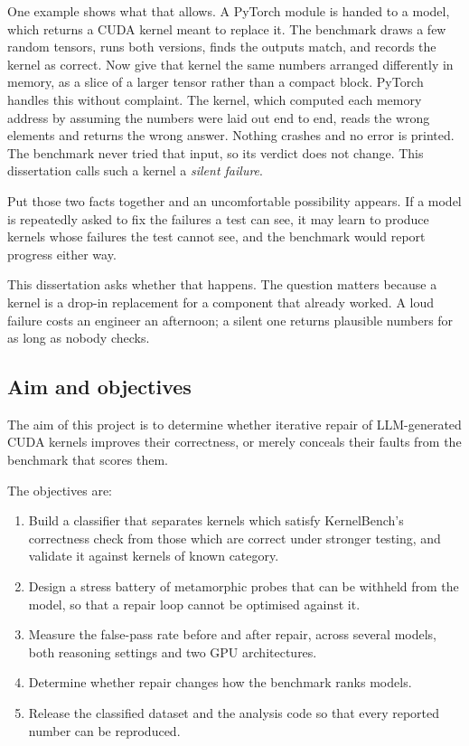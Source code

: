 \documentclass[12pt]{article}
\begin{document}
One example shows what that allows. A PyTorch module is handed to a model,
which returns a CUDA kernel meant to replace it. The benchmark draws a few
random tensors, runs both versions, finds the outputs match, and records the
kernel as correct. Now give that kernel the same numbers arranged differently
in memory, as a slice of a larger tensor rather than a compact block. PyTorch
handles this without complaint. The kernel, which computed each memory address
by assuming the numbers were laid out end to end, reads the wrong elements and
returns the wrong answer. Nothing crashes and no error is printed. The
benchmark never tried that input, so its verdict does not change. This
dissertation calls such a kernel a \emph{silent failure}.

Put those two facts together and an uncomfortable possibility appears. If a
model is repeatedly asked to fix the failures a test can see, it may learn to
produce kernels whose failures the test cannot see, and the benchmark would
report progress either way.

This dissertation asks whether that happens. The question matters because a
kernel is a drop-in replacement for a component that already worked. A loud
failure costs an engineer an afternoon; a silent one returns plausible numbers
for as long as nobody checks.

\subsection{Aim and objectives}
\label{sec:aim}

The aim of this project is to determine whether iterative repair of
LLM-generated CUDA kernels improves their correctness, or merely conceals their
faults from the benchmark that scores them.

The objectives are:

\begin{enumerate}
\item Build a classifier that separates kernels which satisfy KernelBench's
correctness check from those which are correct under stronger testing, and
validate it against kernels of known category.
\item Design a stress battery of metamorphic probes that can be withheld from
the model, so that a repair loop cannot be optimised against it.
\item Measure the false-pass rate before and after repair, across several
models, both reasoning settings and two GPU architectures.
\item Determine whether repair changes how the benchmark ranks models.
\item Release the classified dataset and the analysis code so that every
reported number can be reproduced.
\end{enumerate}
\end{document}
